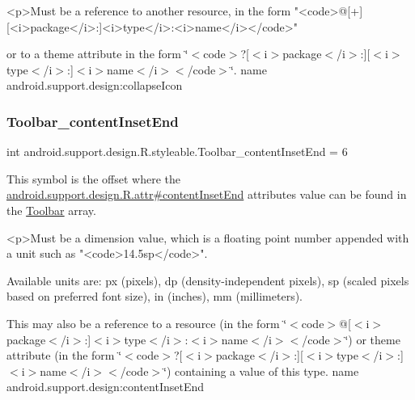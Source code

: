 \begin{DoxyVerb}      <p>Must be a reference to another resource, in the form "<code>@[+][<i>package</i>:]<i>type</i>:<i>name</i></code>"
\end{DoxyVerb}
 or to a theme attribute in the form \char`\"{}$<$code$>$?\mbox{[}$<$i$>$package$<$/i$>$\+:\mbox{]}\mbox{[}$<$i$>$type$<$/i$>$\+:\mbox{]}$<$i$>$name$<$/i$>$$<$/code$>$\char`\"{}.  name android.\+support.\+design\+:collapse\+Icon \mbox{\label{classandroid_1_1support_1_1design_1_1R_1_1styleable_a0ed60bf0f8960c63916d30821f0bca48}} 
\subsubsection{\texorpdfstring{Toolbar\+\_\+content\+Inset\+End}{Toolbar\_contentInsetEnd}}
{\footnotesize\ttfamily int android.\+support.\+design.\+R.\+styleable.\+Toolbar\+\_\+content\+Inset\+End = 6\hspace{0.3cm}{\ttfamily [static]}}

This symbol is the offset where the \hyperlink{classandroid_1_1support_1_1design_1_1R_1_1attr_a344dc4ed8f3a982023c3679ecac0347f}{android.\+support.\+design.\+R.\+attr\#content\+Inset\+End} attribute\textquotesingle{}s value can be found in the \hyperlink{classandroid_1_1support_1_1design_1_1R_1_1styleable_a7783ebe780dbe2a845802a40519a46e9}{Toolbar} array.

\begin{DoxyVerb}      <p>Must be a dimension value, which is a floating point number appended with a unit such as "<code>14.5sp</code>".
\end{DoxyVerb}
 Available units are\+: px (pixels), dp (density-\/independent pixels), sp (scaled pixels based on preferred font size), in (inches), mm (millimeters). 

This may also be a reference to a resource (in the form \char`\"{}$<$code$>$@\mbox{[}$<$i$>$package$<$/i$>$\+:\mbox{]}$<$i$>$type$<$/i$>$\+:$<$i$>$name$<$/i$>$$<$/code$>$\char`\"{}) or theme attribute (in the form \char`\"{}$<$code$>$?\mbox{[}$<$i$>$package$<$/i$>$\+:\mbox{]}\mbox{[}$<$i$>$type$<$/i$>$\+:\mbox{]}$<$i$>$name$<$/i$>$$<$/code$>$\char`\"{}) containing a value of this type.  name android.\+support.\+design\+:content\+Inset\+End \mbox{\label{classandroid_1_1support_1_1design_1_1R_1_1styleable_a16a950fb278dbd84e59f4e5475d33578}} 
